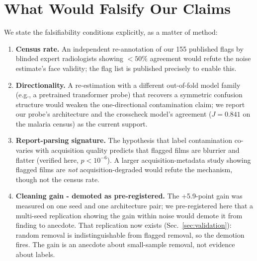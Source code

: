\section{What Would Falsify Our Claims}
\label{sec:falsify}
We state the falsifiability conditions explicitly, as a matter of method:
\begin{enumerate}
\item \textbf{Census rate.} An independent re-annotation of our 155
published flags by blinded expert radiologists showing $<50\%$
agreement would refute the noise estimate's face validity; the flag list
is published precisely to enable this.
\item \textbf{Directionality.} A re-estimation with a different
out-of-fold model family (e.g., a pretrained transformer probe) that
recovers a symmetric confusion structure would weaken the one-directional
contamination claim; we report our probe's architecture and the
crosscheck model's agreement ($J=0.841$ on the malaria census) as the
current support.
\item \textbf{Report-parsing signature.} The hypothesis that label
contamination co-varies with acquisition quality predicts that flagged
films are blurrier and flatter (verified here, $p<10^{-6}$). A larger
acquisition-metadata study showing flagged films are \emph{not}
acquisition-degraded would refute the mechanism, though not the census
rate.
\item \textbf{Cleaning gain - demoted as pre-registered.} The +5.9-point gain was measured on one seed and one architecture pair; we pre-registered here that a multi-seed replication showing the gain within noise would demote it from finding to anecdote. That replication now exists (Sec.~\ref{sec:validation}): random removal is indistinguishable from flagged removal, so the demotion fires. The gain is an anecdote about small-sample removal, not evidence about labels.
\end{enumerate}

